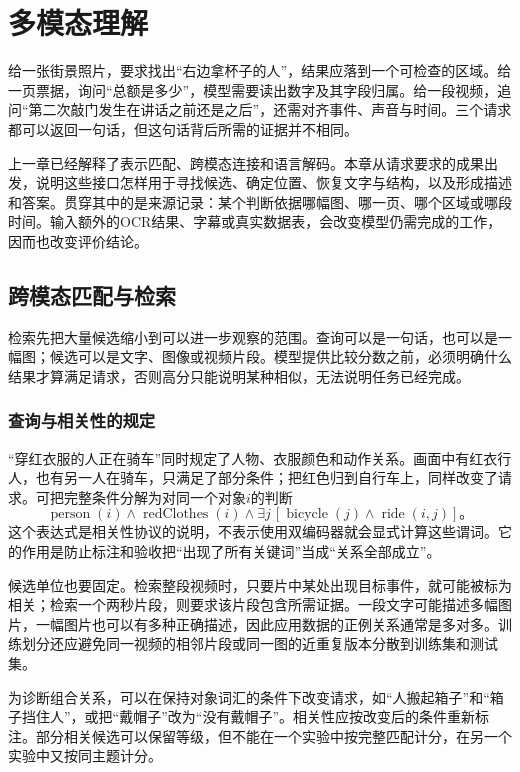\chapter{多模态理解}
\label{chap:vision-multimodal-understanding}

给一张街景照片，要求找出“右边拿杯子的人”，结果应落到一个可检查的区域。给一页票据，询问“总额是多少”，模型需要读出数字及其字段归属。给一段视频，追问“第二次敲门发生在讲话之前还是之后”，还需对齐事件、声音与时间。三个请求都可以返回一句话，但这句话背后所需的证据并不相同。

上一章已经解释了表示匹配、跨模态连接和语言解码。本章从请求要求的成果出发，说明这些接口怎样用于寻找候选、确定位置、恢复文字与结构，以及形成描述和答案。贯穿其中的是来源记录：某个判断依据哪幅图、哪一页、哪个区域或哪段时间。输入额外的OCR结果、字幕或真实数据表，会改变模型仍需完成的工作，因而也改变评价结论。

\section{跨模态匹配与检索}
\label{sec:vision-understanding-retrieval}

检索先把大量候选缩小到可以进一步观察的范围。查询可以是一句话，也可以是一幅图；候选可以是文字、图像或视频片段。模型提供比较分数之前，必须明确什么结果才算满足请求，否则高分只能说明某种相似，无法说明任务已经完成。

\subsection{查询与相关性的规定}
\label{sec:vision-understanding-relevance}

“穿红衣服的人正在骑车”同时规定了人物、衣服颜色和动作关系。画面中有红衣行人，也有另一人在骑车，只满足了部分条件；把红色归到自行车上，同样改变了请求。可把完整条件分解为对同一个对象$i$的判断
\[
  \operatorname{person}(i)\land\operatorname{redClothes}(i)
  \land\exists j\,[\operatorname{bicycle}(j)\land\operatorname{ride}(i,j)]\text{。}
\]
这个表达式是相关性协议的说明，不表示使用双编码器就会显式计算这些谓词。它的作用是防止标注和验收把“出现了所有关键词”当成“关系全部成立”。

候选单位也要固定。检索整段视频时，只要片中某处出现目标事件，就可能被标为相关；检索一个两秒片段，则要求该片段包含所需证据。一段文字可能描述多幅图片，一幅图片也可以有多种正确描述，因此应用数据的正例关系通常是多对多。训练划分还应避免同一视频的相邻片段或同一图的近重复版本分散到训练集和测试集。

为诊断组合关系，可以在保持对象词汇的条件下改变请求，如“人搬起箱子”和“箱子挡住人”，或把“戴帽子”改为“没有戴帽子”。相关性应按改变后的条件重新标注。部分相关候选可以保留等级，但不能在一个实验中按完整匹配计分，在另一个实验中又按同主题计分。

